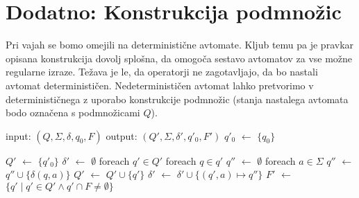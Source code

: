 \documentclass{article}
\begin{document}
\section{Dodatno: Konstrukcija podmnožic}
Pri vajah se bomo omejili na deterministične avtomate.
Kljub temu pa je pravkar opisana konstrukcija dovolj splošna, da omogoča sestavo avtomatov za vse možne regularne izraze.
Težava je le, da operatorji ne zagotavljajo, da bo nastali avtomat determinističen.
Nedeterminističen avtomat lahko pretvorimo v determinističnega z uporabo konstrukcije podmnožic (stanja nastalega avtomata bodo označena s podmnožicami $Q$). 

\begin{algorithm}
  input: $(Q, \Sigma, \delta, q_{0}, F)$
  output: $(Q', \Sigma, \delta', q'_{0}, F')$
  $q'_0$ $\gets$ $\{q_{0}\}$

  $Q'$ $\gets$ $\{q'_0\}$
  $\delta'$ $\gets$ $\emptyset$
  foreach $q' \in Q'$
    foreach $q \in q'$
      $q''$ $\gets$ $\emptyset$
      foreach $a \in \Sigma$
        $q''$ $\gets$ $q'' \cup \{\delta(q, a)\}$
      $Q'$ $\gets$ $Q' \cup \{q'\}$
      $\delta'$ $\gets$ $\delta' \cup \{(q', a) \mapsto q''\}$
  $F'$ $\gets$ $\{q' \mid q' \in Q' \land q' \cap F \neq \emptyset \}$
\end{algorithm}

\printbibliography
\end{document}
